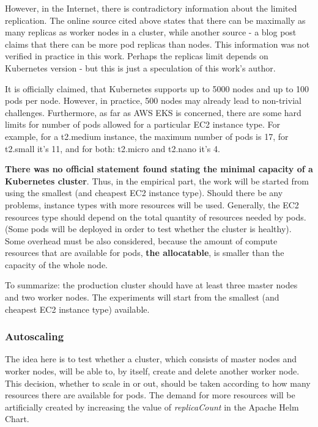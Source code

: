 However, in the Internet, there is contradictory information about the limited replication. The online source cited above\cite{kubernetes-node-size} states that there can be maximally as many replicas as worker nodes in a cluster, while another source - a blog post\cite{learnk8s-ll} claims that there can be more pod replicas than nodes. This information was not verified in practice in this work. Perhaps the replicas limit depends on Kubernetes version - but this is just a speculation of this work's author.

It is officially claimed, that Kubernetes supports up to 5000 nodes and up to 100 pods per node\cite{kubernetes-node-size}\cite{kubernetes-large}. However, in practice, 500 nodes may already lead to non-trivial challenges. Furthermore, as far as AWS EKS is concerned, there are some hard limits for number of pods allowed for a particular EC2 instance type. For example, for a t2.medium instance, the maximum number of pods is 17, for t2.small it's 11, and for both: t2.micro and t2.nano it's 4\cite{kubernetes-node-size}\cite{eks-hard-limits}.

\textbf{There was no official statement found stating the minimal capacity of a Kubernetes cluster}. Thus, in the empirical part, the work will be started from using the smallest (and cheapest EC2 instance type). Should there be any problems, instance types with more resources will be used. Generally, the EC2 resources type should depend on the total quantity of resources needed by pods. (Some pods will be deployed in order to test whether the cluster is healthy). Some overhead must be also considered, because the amount of compute resources that are available for pods, \textbf{the allocatable}, is smaller than the capacity of the whole node\cite{k8s-alloc}.

To summarize: the production cluster should have at least three master nodes and two worker nodes. The experiments will start from the smallest (and cheapest EC2 instance type) available.

\subsubsection{Autoscaling}

The idea here is to test whether a cluster, which consists of master nodes and worker nodes, will be able to, by itself, create and delete another worker node. This decision, whether to scale in or out, should be taken according to how many resources there are available for pods. The demand for more resources will be artificially created by increasing the value of \textit{replicaCount} in the Apache Helm Chart\cite{helm-apache}.


